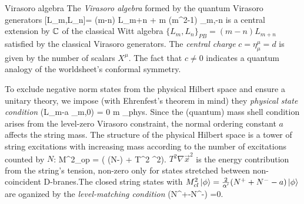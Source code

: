 \begin{mybox}{Virasoro algebra }
	The \emph{Virasoro algebra} formed by the quantum Virasoro generators 
	\be 
	\label{eq:stringVirasoroAlgebra}
	[L_m,L_n]= (m-n) L_{m+n} +  m (m^2-1) \delta_{m,-n}
	\ee 
	is a central extension by $\mathbb{C}$ of the classical Witt algebra $\{L_m,L_n\}_{PB} = (m-n)L_{m+n}$ satisfied by the classical Virasoro generators. The \emph{central charge} $c = \eta^\mu_\mu = d$ is given by the number of scalars $X^\mu$. The fact that $c \neq 0$ indicates a quantum analogy of the worldsheet's conformal symmetry.
\end{mybox}
To exclude negative norm states from the physical Hilbert space and ensure a unitary theory, we impose (with Ehrenfest's theorem in mind) they \emph{physical state condition} 
\be 
\label{eq:stringPhysicalStatecond}
(L_m-a \delta_{m,0}) \ket{\phi} = 0 \quad \forall m   \forall \ket{\phi}\in \mH_{phys}.
\ee 
Since the (quantum) mass shell condition arises from the level-zero Virasoro constraint, the normal ordering constant $a$ affects the string mass. The structure of the physical Hilbert space is a tower of string excitations with increasing mass according to the number of excitations counted by $N$:
\be
M^2_{op} \ket{\phi} = \left( (N-\alpha) + T^2 \Delta {}^2\right)\ket{\phi}.
\ee 
$T^2 \nabla \vec{x}^2$ is the energy contribution from the string's tension, non-zero only for states stretched between non-coincident D-branes.The closed string states with $M^2_{cl} \ket{\phi} = \frac{2}{\alpha^\prime} (N^++N^--a) \ket{\phi}$ are oganized by the \emph{level-matching condition}
\bse 
(N^+-N^-) \ket{\phi}=0.
\ese 
